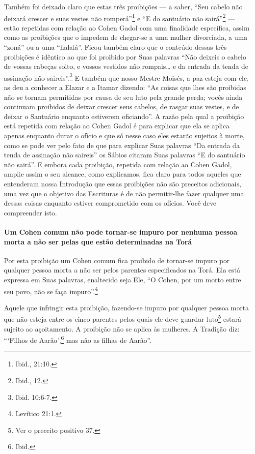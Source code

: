 Também foi deixado claro que estas três proibições --- a saber, ``Seu
cabelo não deixará crescer e suas vestes não romperá''\footnote{Ibid., 21:10.} e
``E do santuário não sairá''\footnote{Ibid., 12.} --- estão repetidas com
relação ao Cohen Gadol com uma finalidade específica, assim como as
proibições que o impedem de chegar-se a uma mulher divorciada, a uma
``zoná'' ou a uma ``halalá''. Ficou também claro que o conteúdo dessas
três proibições é idêntico ao que foi proibido por Suas palavras ``Não
deixeis o cabelo de vossas cabeças solto, e vossos vestidos não
rompais\ldots{} e da entrada da tenda de assinação não saireis''.\footnote{Ibid.
10:6-7.} E também que nosso Mestre Moisés, a paz esteja com ele, as deu
a conhecer a Elazar e a Itamar dizendo: ``As coisas que lhes são
proibidas não se tornam permitidas por causa de seu luto pela grande
perda; vocês ainda continuam proibidos de deixar crescer seus cabelos,
de rasgar suas vestes, e de deixar o Santuário enquanto estiverem
oficiando''. A razão pela qual a proibição está repetida com relação ao
Cohen Gadol é para explicar que ela se aplica apenas enquanto durar
o ofício e que só nesse caso eles estarão sujeitos à morte, como se
pode ver pelo fato de que para explicar Suas palavras ``Da entrada da
tenda de assinação não saireis'' os Sábios citaram Suas palavras ``E do
santuário não sairá''. E embora cada proibição, repetida com relação ao
Cohen Gadol, amplie assim o seu alcance, como explicamos, fica claro
para todos aqueles que entenderam nossa Introdução que essas proibições
não são preceitos adicionais, uma vez que o objetivo das Escrituras é
de não permitir-lhe fazer qualquer uma dessas coisas enquanto estiver
comprometido com os ofícios. Você deve compreender isto.

\paragraph{Um Cohen comum não pode tornar-se impuro por nenhuma pessoa
morta a não ser pelas que estão determinadas na Torá}

Por esta proibição um Cohen comum fica proibido de tornar-se impuro
por qualquer pessoa morta a não ser pelos parentes especificados na
Torá. Ela está expressa em Suas palavras, enaltecido seja Ele, ``O
Cohen, por um morto entre seu povo, não se faça impuro''.\footnote{Levítico
21:1.}

Aquele que infringir esta proibição, fazendo-se impuro por qualquer
pessoa morta que não esteja entre os cinco parentes pelos quais ele deve
guardar luto\footnote{Ver o preceito positivo 37.} estará sujeito ao açoitamento. A
proibição não se aplica às mulheres. A Tradição diz: ```Filhos de
Aarão',\footnote{Ibid.} mas não as filhas de Aarão''.


